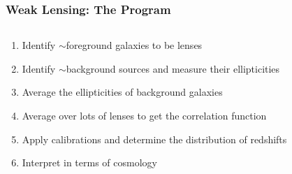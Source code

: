 \documentclass{beamer}
\begin{document}
\frame
{
    \frametitle{Weak Lensing: The Program}


    \begin{columns}
        \begin{column}{0.5\textwidth}    
            \begin{enumerate}

                \item Identify $\sim$foreground galaxies to be lenses

                \item Identify $\sim$background sources and measure their
                    ellipticities %

                \item Average the ellipticities of background galaxies

                \item Average over lots of lenses to get the correlation
                    function

                \item Apply calibrations and determine the distribution
                    of redshifts

                \item Interpret in terms of cosmology


\end{enumerate}
\end{column}
\end{columns}}
\end{document}
